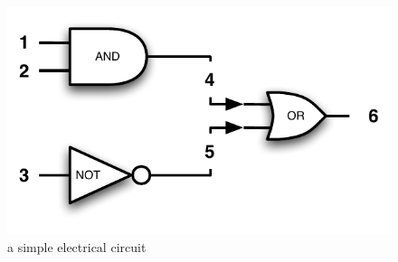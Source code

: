 \documentclass{article}
\begin{document}
\begin{figure}[htb]
    \centering
    \includegraphics[scale=0.50]{circuit}
    \caption{a simple electrical circuit}
    \label{circuit}
\end{figure}
\end{document}
